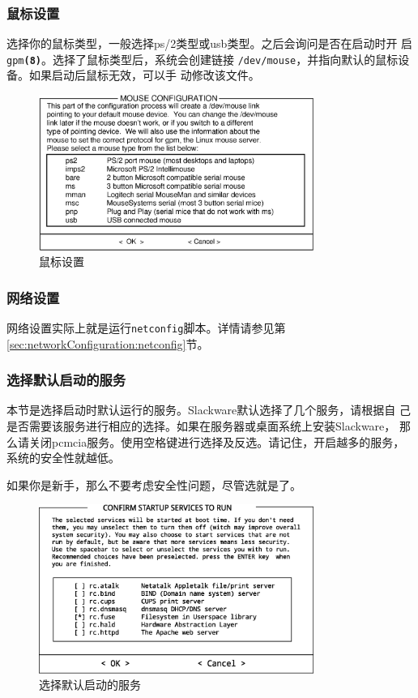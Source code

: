 \subsubsection{鼠标设置}
\label{sec:installation:setup:configure:mouse}
选择你的鼠标类型，一般选择ps/2类型或usb类型。之后会询问是否在启动时开
启\texttt{gpm\textbf{(8)}}。选择了鼠标类型后，系统会创建链接
\texttt{/dev/mouse}，并指向默认的鼠标设备。如果启动后鼠标无效，可以手
动修改该文件。
\begin{figure}[htpb]
  \centering
  \includegraphics[width=0.8\textwidth]{images/installation/setup-mouse.eps}
  \caption{鼠标设置}
  \label{fig:setup-mouse}
\end{figure}

\subsubsection{网络设置}
\label{sec:installation:setup:configure:network}
网络设置实际上就是运行\texttt{netconfig}脚本。详情请参见第
\ref{sec:networkConfiguration:netconfig}节。

\subsubsection{选择默认启动的服务}
\label{sec:installation:setup:configure:services}
本节是选择启动时默认运行的服务。Slackware默认选择了几个服务，请根据自
己是否需要该服务进行相应的选择。如果在服务器或桌面系统上安装Slackware，
那么请关闭pcmcia服务。使用空格键进行选择及反选。请记住，开启越多的服务，
系统的安全性就越低。

如果你是新手，那么不要考虑安全性问题，尽管选就是了。
\begin{figure}[htpb]
  \centering
  \includegraphics[width=0.8\textwidth]{images/installation/setup-services.eps}
  \caption{选择默认启动的服务}
  \label{fig:setup-services}
\end{figure}

